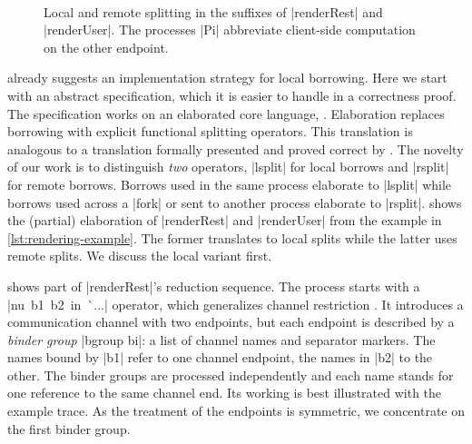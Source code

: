 \begin{figure}
  \TightCode
  \begin{minipage}[t]{0.48\linewidth}
    \LocalSplitReduction
  \end{minipage}\hfill
  \begin{minipage}[t]{0.48\linewidth}
    \RemoteSplitReduction
  \end{minipage}\\
  \begin{subcaptiongroup}
    \parbox{.49\linewidth}{%
      \caption{Local split reduction suffix}
      \label{fig:local-split-trace}}\hfill
    \parbox{.48\linewidth}{%
      \caption{Remote split and acquire reduction suffix}
      \label{fig:remote-split-trace}}%
  \end{subcaptiongroup}
  \caption{Local and remote splitting in the suffixes of |renderRest| and
    |renderUser|. The processes |Pi| abbreviate client-side computation on the
    other endpoint.}
  \label{fig:local-split-reduction}
\end{figure}

 already suggests an implementation strategy for local
borrowing. Here we start with an abstract specification, which it is easier
to handle in a correctness proof. The specification works on an elaborated core
language, \thecalculus. Elaboration replaces borrowing with explicit functional
splitting operators. This translation is analogous to a translation formally
presented and proved correct by \citet{DBLP:journals/pacmpl/SaffrichS0V25}. The
novelty of our work is to distinguish 
\emph{two} operators, |lsplit| for local borrows and |rsplit| for
remote borrows. Borrows used in the same process elaborate to |lsplit| while
borrows used across a |fork| or sent to another process elaborate to |rsplit|.
 shows the (partial) elaboration of
|renderRest| and |renderUser| from the example in \cref{lst:rendering-example}.
The former translates to local splits while the latter uses remote
splits. We discuss the local variant first.

 shows part of |renderRest|'s
reduction sequence. The process starts with a \mbox{|nu b1 b2 in ^^ ...|}
operator, which generalizes channel restriction \citep{Gay_Vasconcelos_2025}. It
introduces a communication channel with two endpoints, but each endpoint is
described by a \emph{binder group} |bgroup bi|: a list of channel names and separator markers.
The names bound by |b1| refer to one channel endpoint, the names in |b2| to the
other. The binder groups are processed independently and each name stands for
one reference to the same channel end. Its working is best illustrated with the example trace.
As the treatment of the endpoints is symmetric, we concentrate on the first
binder group.


